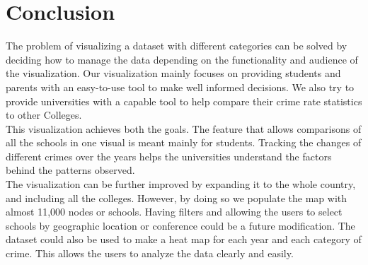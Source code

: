 \documentclass[journal]{vgtc}                %
\begin{document}
\section{Conclusion} \label{conclusion}

The problem of visualizing a dataset with different categories can be solved by deciding how to manage the data depending on the functionality and audience of the visualization. Our visualization mainly focuses on providing students and parents with an easy-to-use tool to make well informed decisions. We also try to provide universities with a capable tool to help compare their crime rate statistics to other Colleges.\\
This visualization achieves both the goals. The feature that allows comparisons of all the schools in one visual is meant mainly for students. Tracking the changes of different crimes over the years helps the universities understand the factors behind the patterns observed.\\
The visualization can be further improved by expanding it to the whole country, and including all the colleges. However, by doing so we populate the map with almost 11,000 nodes or schools. Having filters and allowing the users to select schools by geographic location or conference could be a future modification. The dataset could also be used to make a heat map for each year and each category of crime. This allows the users to analyze the data clearly and easily. 


%

%
%
%


\end{document}
